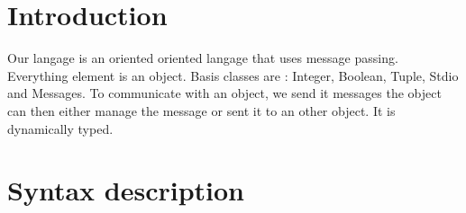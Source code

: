 \documentclass{eplDoc}
\begin{document}
\maketitle
\newpage

\section{Introduction}
Our langage is an oriented oriented langage that uses message passing.  
Everything element is an object.  Basis classes are : Integer, Boolean, Tuple, 
Stdio and Messages.  To communicate with an object, we send it messages the 
object can then either manage the message or sent it to an other object.
It is dynamically typed. %
\section{Syntax description}
\end{document}
